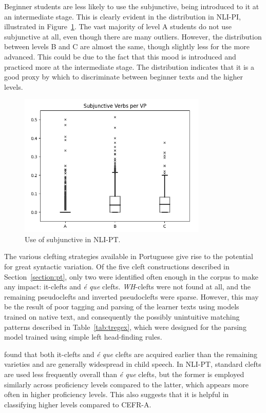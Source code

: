 Beginner students are less likely to use the subjunctive, being introduced to it at an intermediate stage. This is clearly evident in the distribution in NLI-PI, illustrated in Figure~\ref{fig:subjunctive}. The vast majority of level A students do not use subjunctive at all, even though there are many outliers. However, the distribution between levels B and C are almost the same, though slightly less for the more advanced. This could be due to the fact that this mood is introduced and practiced more at the intermediate stage. The distribution indicates that it is a good proxy by which to discriminate between beginner texts and the higher levels.

\begin{figure}[H]
    \centering
    \includegraphics[width=0.8\textwidth]{images/svp.png}
    \caption{Use of subjunctive in NLI-PT.}
    \label{fig:subjunctive}
\end{figure}

The various clefting strategies available in Portuguese give rise to the potential for great syntactic variation. Of the five cleft constructions described in Section~\ref{section:pt}, only two were identified often enough in the corpus to make any impact: it-clefts and \textit{é que} clefts. \textit{WH}-clefts were not found at all, and the remaining pseudoclefts and inverted pseudoclefts were sparse. However, this may be the result of poor tagging and parsing of the learner texts using models trained on native text, and consequently the possibly unintuitive matching patterns described in Table~\ref{tab:tregex}, which were designed for the parsing model trained using simple left head-finding rules.

 found that both it-clefts and \textit{é que} clefts are acquired earlier than the remaining varieties and are generally widespread in child speech. In NLI-PT, standard clefts are used less frequently overall than \textit{é que} clefts, but the former is employed similarly across proficiency levels compared to the latter, which appears more often in higher proficiency levels. This also suggests that it is helpful in classifying higher levels compared to CEFR-A.

